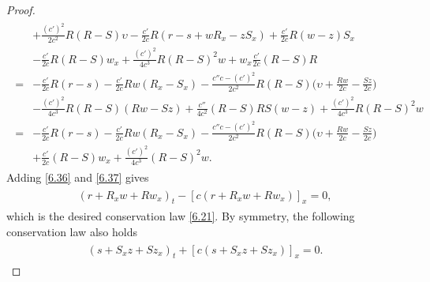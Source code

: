 \documentclass[10pt,a4paper]{amsart}
\newcommand{\fr}{\frac}
\begin{document}
\begin{proof}
\begin{align}
\begin{split}
&+\fr{(c')^2}{2c^2}R(R-S)\upsilon -\fr{c'}{2c}R(r-s+wR_x-zS_x) +\fr{c'}{2c}R(w-z)S_x \\
&-\fr{c'}{2c}R(R-S)w_x +\fr{(c')^2}{4c^3}R(R-S)^2w +w_x\fr{c'}{2c}(R-S)R \\
=&-\fr{c'}{2c}R(r-s) -\fr{c'}{2c}Rw(R_x-S_x)-\fr{c''c-(c')^2}{2c^2}R(R-S)\Big(\upsilon+\fr{Rw}{2c}-\fr{Sz}{2c}\Big) \\
&-\fr{(c')^2}{4c^3}R(R-S)(Rw-Sz)+\fr{c''}{4c^2}(R-S)RS(w-z)+\fr{(c')^2}{4c^3}R(R-S)^2w \\
=&-\fr{c'}{2c}R(r-s) -\fr{c'}{2c}Rw(R_x-S_x)-\fr{c''c-(c')^2}{2c^2}R(R-S)\Big(\upsilon+\fr{Rw}{2c}-\fr{Sz}{2c}\Big) \\
&+\fr{c'}{2c}(R-S)w_x +\fr{(c')^2}{4c^3}(R-S)^2w.
\end{split}
\end{align}
Adding \eqref{6.36} and \eqref{6.37} gives
\begin{align}\label{6.38}
\begin{split}
(r+R_x w+Rw_x)_t-[c(r+R_x w+Rw_x)]_x=0,
\end{split}
\end{align}
which is the desired conservation law \eqref{6.21}. By symmetry, the following conservation law also holds
\begin{align}\label{6.39}
\begin{split}
(s+S_x z+Sz_x)_t+[c(s+S_x z+Sz_x)]_x=0.
\end{split}
\end{align}


\end{proof}
\end{document}
